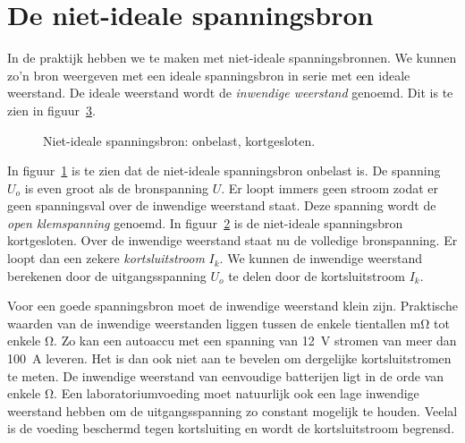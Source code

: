 \section{De niet-ideale spanningsbron}
\label{sec:gelnietidealespanningsbron}
In de praktijk hebben we te maken met niet-ideale spanningsbronnen. We kunnen zo'n bron
weergeven met een ideale spanningsbron in serie met een ideale weerstand. De ideale
weerstand wordt de \textsl{inwendige weerstand} genoemd. Dit is te zien in
figuur~\ref{fig:gelnisopenkort}.

\begin{figure}[!ht]
\begin{subfigure}{0.5\textwidth}
\centering
{}
\caption{}
\label{fig:gelnisopen}
\end{subfigure}%
\begin{subfigure}{0.5\textwidth}
\centering
{}
\caption{}
\label{fig:gelniskort}
\end{subfigure}
\caption{Niet-ideale spanningsbron:  onbelast,  kortgesloten.}
\label{fig:gelnisopenkort}
\end{figure}

In figuur~\ref{fig:gelnisopen} is te zien dat de niet-ideale spanningsbron onbelast is.
De spanning $U_o$ is even groot als de bronspanning $U$. Er loopt immers geen stroom zodat
er geen spanningsval over de inwendige weerstand staat. Deze spanning wordt de \textsl{open
klemspanning} genoemd. In figuur~\ref{fig:gelniskort} is
de niet-ideale spanningsbron kortgesloten. Over de inwendige weerstand staat nu de volledige
bronspanning. Er loopt dan een zekere \textsl{kortsluitstroom} $I_k$. We kunnen de inwendige
weerstand berekenen door de uitgangsspanning $U_o$ te delen door de kortsluitstroom $I_k$.

Voor een goede spanningsbron moet de inwendige weerstand klein zijn. Praktische waarden van
de inwendige weerstanden liggen tussen de enkele tientallen \si{\milli\ohm} tot enkele \si{\ohm}.
Zo kan een autoaccu met een spanning van \SI{12}{\volt} stromen van meer dan \SI{100}{\ampere}
leveren. Het is dan
ook niet aan te bevelen om dergelijke kortsluitstromen te meten. De inwendige weerstand
van eenvoudige batterijen ligt in de orde van enkele \si{\ohm}. Een laboratoriumvoeding moet
natuurlijk ook een lage inwendige weerstand hebben om de uitgangsspanning zo constant
mogelijk te houden. Veelal is de voeding beschermd tegen kortsluiting en wordt de
kortsluitstroom begrensd.


